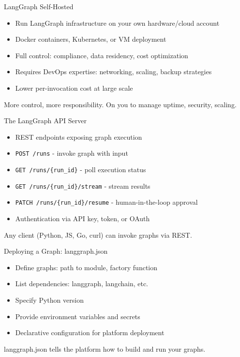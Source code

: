 \documentclass[aspectratio=169,11pt]{beamer}
\begin{document}
\begin{frame}{LangGraph Self-Hosted}
\setlength{\itemsep}{1pt}
\begin{itemize}
\item Run LangGraph infrastructure on your own hardware/cloud account
\item Docker containers, Kubernetes, or VM deployment
\item Full control: compliance, data residency, cost optimization
\item Requires DevOps expertise: networking, scaling, backup strategies
\item Lower per-invocation cost at large scale
\end{itemize}
\vspace{0.15cm}
\begin{warningbox}
More control, more responsibility. On you to manage uptime, security, scaling.
\end{warningbox}
\end{frame}

\begin{frame}{The LangGraph API Server}
\setlength{\itemsep}{1pt}
\begin{itemize}
\item REST endpoints exposing graph execution
\item \texttt{POST /runs} - invoke graph with input
\item \texttt{GET /runs/\{run\_id\}} - poll execution status
\item \texttt{GET /runs/\{run\_id\}/stream} - stream results
\item \texttt{PATCH /runs/\{run\_id\}/resume} - human-in-the-loop approval
\item Authentication via API key, token, or OAuth
\end{itemize}
\vspace{0.15cm}
\begin{conceptbox}
Any client (Python, JS, Go, curl) can invoke graphs via REST.
\end{conceptbox}
\end{frame}

\begin{frame}{Deploying a Graph: langgraph.json}
\setlength{\itemsep}{1pt}
\begin{itemize}
\item Define graphs: path to module, factory function
\item List dependencies: langgraph, langchain, etc.
\item Specify Python version
\item Provide environment variables and secrets
\item Declarative configuration for platform deployment
\end{itemize}
\vspace{0.1cm}
\begin{tipbox}[Configuration]
langgraph.json tells the platform how to build and run your graphs.
\end{tipbox}
\end{frame}
\end{document}
